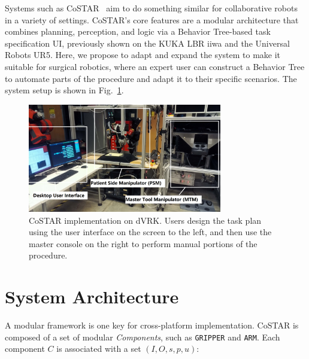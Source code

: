 \documentclass[letterpaper, 10 pt, conference]{ieeeconf}
\begin{document}


Systems such as CoSTAR~\cite{paxton2017costar} aim to do something similar for collaborative robots in a variety of settings. 
CoSTAR's core features are a modular architecture that combines planning, perception, and logic via a Behavior Tree-based task specification UI, previously shown on the KUKA LBR iiwa and the Universal Robots UR5. Here, we propose to adapt and expand the system to make it suitable for surgical robotics, where an expert user can construct a Behavior Tree to automate parts of the procedure and adapt it to their specific scenarios.
The system setup is shown in Fig.~\ref{fig:dvrk}. 

\begin{figure}[bt]
\centering
\includegraphics[width=240pt]{dvrk.png}
\caption{CoSTAR implementation on dVRK. Users design the task plan using the user interface on the screen to the left, and then use the master console on the right to perform manual portions of the procedure.}
\label{fig:dvrk}
\end{figure}


\section{System Architecture}
A modular framework is one key for cross-platform implementation. CoSTAR is composed of a set of modular \textit{Components}, such as \texttt{GRIPPER} and \texttt{ARM}. Each component $C$ is associated with a set $(I,O,s,p,u)$: 
\end{document}
